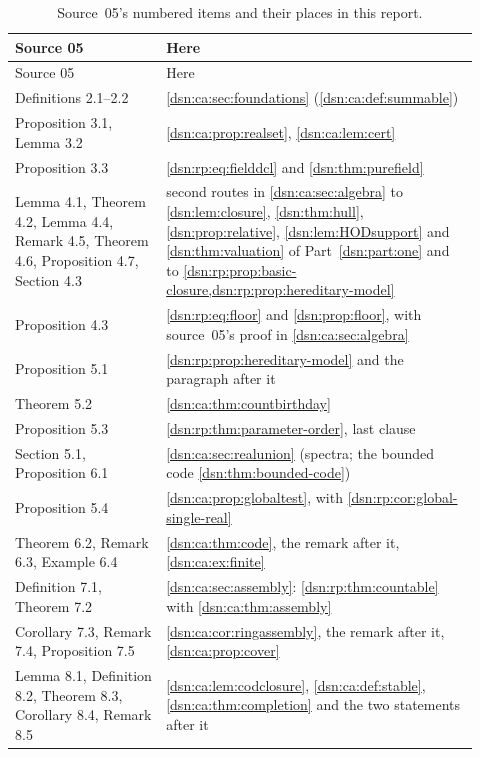 \documentclass[11pt,a4paper]{article}
\numberwithin{equation}{section}
\theoremstyle{definition}
\theoremstyle{remark}
\begin{document}
{\small
\begin{longtable}{@{}P{0.30\linewidth}P{0.62\linewidth}@{}}
\caption{Source~05's numbered items and their places in this report.}
\label{dsn:rp:tab:corr05}\\
\toprule
Source 05 & Here\\
\midrule
\endfirsthead
\toprule
Source 05 & Here\\
\midrule
\endhead
Definitions 2.1--2.2 & \cref{dsn:ca:sec:foundations} (\cref{dsn:ca:def:summable})\\
Proposition 3.1, Lemma 3.2 & \cref{dsn:ca:prop:realset}, \cref{dsn:ca:lem:cert}\\
Proposition 3.3 & \eqref{dsn:rp:eq:fielddcl} and \cref{dsn:thm:purefield}\\
Lemma 4.1, Theorem 4.2, Lemma 4.4, Remark 4.5, Theorem 4.6, Proposition 4.7, Section 4.3 &
second routes in \cref{dsn:ca:sec:algebra} to \cref{dsn:lem:closure},
\cref{dsn:thm:hull}, \cref{dsn:prop:relative}, \cref{dsn:lem:HODsupport} and
\cref{dsn:thm:valuation} of Part~\ref{dsn:part:one} and to
\cref{dsn:rp:prop:basic-closure,dsn:rp:prop:hereditary-model}\\
Proposition 4.3 & \eqref{dsn:rp:eq:floor} and \cref{dsn:prop:floor}, with source~05's proof in \cref{dsn:ca:sec:algebra}\\
Proposition 5.1 & \cref{dsn:rp:prop:hereditary-model} and the paragraph after it\\
Theorem 5.2 & \cref{dsn:ca:thm:countbirthday}\\
Proposition 5.3 & \cref{dsn:rp:thm:parameter-order}, last clause\\
Section 5.1, Proposition 6.1 & \cref{dsn:ca:sec:realunion} (spectra; the bounded code \cref{dsn:thm:bounded-code})\\
Proposition 5.4 & \cref{dsn:ca:prop:globaltest}, with \cref{dsn:rp:cor:global-single-real}\\
Theorem 6.2, Remark 6.3, Example 6.4 & \cref{dsn:ca:thm:code}, the remark after it, \cref{dsn:ca:ex:finite}\\
Definition 7.1, Theorem 7.2 & \cref{dsn:ca:sec:assembly}: \cref{dsn:rp:thm:countable} with \cref{dsn:ca:thm:assembly}\\
Corollary 7.3, Remark 7.4, Proposition 7.5 & \cref{dsn:ca:cor:ringassembly}, the remark after it, \cref{dsn:ca:prop:cover}\\
Lemma 8.1, Definition 8.2, Theorem 8.3, Corollary 8.4, Remark 8.5 &
\cref{dsn:ca:lem:codclosure}, \cref{dsn:ca:def:stable}, \cref{dsn:ca:thm:completion} and the two statements after it\\

\end{longtable}}
\end{document}
